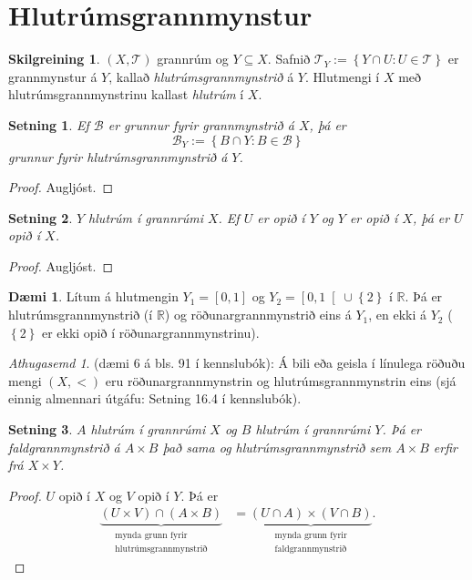 \documentclass[a4paper,icelandic]{book}
\theoremstyle{definition}
\newtheorem{skilgr}{Skilgreining}[section]
\newtheorem{daemi}{Dæmi}[section]
\theoremstyle{plain}
\newtheorem{setn}{Setning}[section]
\theoremstyle{remark}
\newtheorem*{ath}{Athugasemd}
\newcommand{\R}{\mathbb{R}} %
\begin{document}
\section{Hlutrúmsgrannmynstur}
\begin{skilgr}
  $(X,\mathcal T)$ grannrúm og $Y\subseteq X$. Safnið $\mathcal T_Y := \left\{
    Y\cap U : U\in \mathcal T \right\}$ er grannmynstur á $Y$, kallað
  \emph{hlutrúmsgrannmynstrið} á $Y$. Hlutmengi í
  $X$ með hlutrúmsgrannmynstrinu kallast \emph{hlutrúm} í $X$.
\end{skilgr}
\begin{setn}
  Ef $\mathcal B$ er grunnur fyrir grannmynstrið á $X$, þá er 
  \[
  \mathcal B_{Y} := \left\{ B\cap Y : B\in \mathcal B \right\}
  \]
  grunnur fyrir hlutrúmsgrannmynstrið á $Y$.
\end{setn}
\begin{proof}
  Augljóst.
\end{proof}
\begin{setn}
  $Y$ hlutrúm í grannrúmi $X$. Ef $U$ er opið í $Y$ og $Y$ er opið í $X$, þá er
  $U$ opið í $X$.
\end{setn}
\begin{proof}
  Augljóst.
\end{proof}
\begin{daemi}
  Lítum á hlutmengin $Y_1 = \left[ 0,1 \right]$ og $Y_2 = \left[ 0,1
  \right[\cup\left\{ 2 \right\}$ í $\R$. Þá er hlutrúmsgrannmynstrið (í $\R$) og
  röðunargrannmynstrið eins á $Y_1$, en ekki á $Y_2$ ($\left\{ 2 \right\}$ er
  ekki opið í röðunargrannmynstrinu).
\end{daemi}
\begin{ath}
  (dæmi 6 á bls. 91 í kennslubók): Á bili eða geisla í línulega röðuðu mengi
  $(X,<)$ eru röðunargrannmynstrin og hlutrúmsgrannmynstrin eins (sjá einnig
  almennari útgáfu: Setning 16.4 í kennslubók).
\end{ath}
\begin{setn}
  $A$ hlutrúm í grannrúmi $X$ og $B$ hlutrúm í grannrúmi $Y$. Þá er
  faldgrannmynstrið á $A\times B$ það sama og hlutrúmsgrannmynstrið sem $A\times
  B$ erfir frá $X\times Y$.
\end{setn}
\begin{proof}
  $U$ opið í $X$ og $V$ opið í $Y$. Þá er 
  \begin{align*}
    \underbrace{(U\times V)\cap(A\times B)}_{\substack{\text{mynda grunn fyrir}\\\text{hlutrúmsgrannmynstrið}}}
    &= \underbrace{(U\cap A)\times(V\cap B)}_{\substack{\text{mynda grunn fyrir}\\\text{faldgrannmynstrið}}}.
  \end{align*}
\end{proof}
\end{document}
